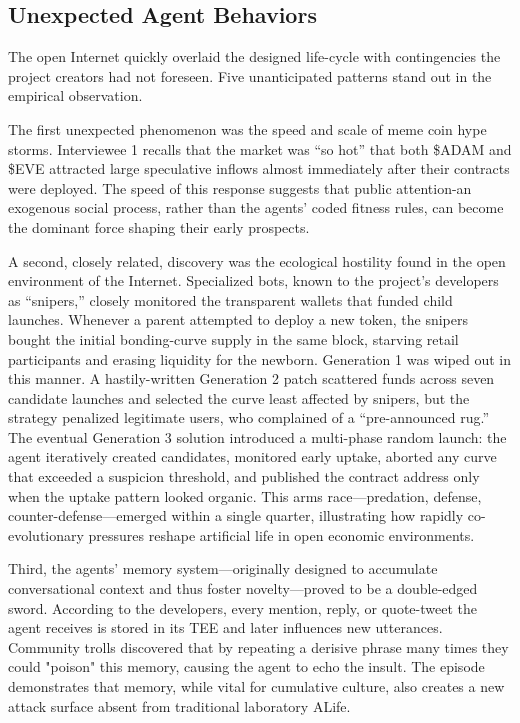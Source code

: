\subsection{Unexpected Agent Behaviors }

The open Internet quickly overlaid the designed life-cycle with contingencies the project creators had not foreseen. Five unanticipated patterns stand out in the empirical observation. 

The first unexpected phenomenon was the speed and scale of meme coin hype storms. Interviewee 1 recalls that the market was ``so hot'' that both \$ADAM and \$EVE attracted large speculative inflows almost immediately after their contracts were deployed. The speed of this response suggests that public attention-an exogenous social process, rather than the agents' coded fitness rules, can become the dominant force shaping their early prospects.

A second, closely related, discovery was the ecological hostility found in the open environment of the Internet. Specialized bots, known to the project's developers as ``snipers,'' closely monitored the transparent wallets that funded child launches. Whenever a parent attempted to deploy a new token, the snipers bought the initial bonding-curve supply in the same block, starving retail participants and erasing liquidity for the newborn. Generation 1 was wiped out in this manner. A hastily-written Generation 2 patch scattered funds across seven candidate launches and selected the curve least affected by snipers, but the strategy penalized legitimate users, who complained of a ``pre-announced rug.'' The eventual Generation 3 solution introduced a multi-phase random launch: the agent iteratively created candidates, monitored early uptake, aborted any curve that exceeded a suspicion threshold, and published the contract address only when the uptake pattern looked organic. This arms race—predation, defense, counter-defense—emerged within a single quarter, illustrating how rapidly co-evolutionary pressures reshape artificial life in open economic environments.

Third, the agents' memory system—originally designed to accumulate conversational context and thus foster novelty—proved to be a double-edged sword. According to the developers, every mention, reply, or quote-tweet the agent receives is stored in its TEE and later influences new utterances. Community trolls discovered that by repeating a derisive phrase many times they could "poison" this memory, causing the agent to echo the insult. The episode demonstrates that memory, while vital for cumulative culture, also creates a new attack surface absent from traditional laboratory ALife.

